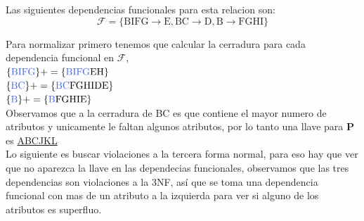 \documentclass[10pt]{article}
\begin{document}
Las siguientes dependencias funcionales para esta relacion son:\\

$$\mathcal{F}=\mathrm{\{ BIFG \rightarrow E, BC \rightarrow D, B \rightarrow FGHI \}}$$

Para normalizar primero tenemos que calcular la cerradura para cada dependencia funcional en $\mathcal{F}$,\\


$\mathrm{\{\textcolor{RoyalBlue}{BIFG}\}+= \{\textcolor{RoyalBlue}{BIFG}EH\}}$\\

$\mathrm{\{\textcolor{RoyalBlue}{BC}\}+= \{\textcolor{RoyalBlue}{BC}FGHIDE\}}$\\

$\mathrm{\{\textcolor{RoyalBlue}{B}\}+= \{\textcolor{RoyalBlue}{B}FGHIE\}}$\\


Observamos que a la cerradura de BC es que contiene el mayor numero de atributos y unicamente le faltan algunos atributos, por lo tanto una llave para \textbf{P} es \underline{ABCJKL} \\

Lo siguiente es buscar violaciones a la tercera forma normal, para eso hay que ver que no aparezca la llave en las dependecias funcionales, observamos que las tres dependencias son violaciones a la 3NF, así que se toma una dependencia funcional con mas de un atributo a la izquierda para ver si alguno de los atributos es superfluo.\\
\end{document}
